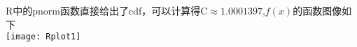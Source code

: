 \documentclass[11pt,a4paper]{ctexart}
\title{\vspace{-5ex}}
\author{基科32 曾柯又 2013012266}
\date{\vspace{-5ex}}
\begin{document}
\abovedisplayskip=5pt
\belowdisplayskip=5pt
\abovedisplayshortskip=0pt
\belowdisplayshortskip=0pt
\maketitle
R中的pnorm函数直接给出了cdf，可以计算得\(\mathrm{C}\approx 1.0001397\),\(f(x)\)的函数图像如下\\
	\texttt{[image: Rplot1]}
\end{document}
